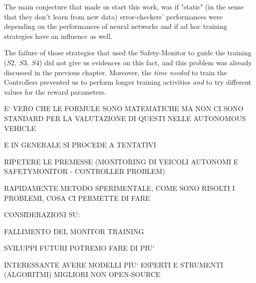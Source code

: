 The main conjecture that made us start this work, was if "static" (in the sense that they don't learn from new data) error-checkers' performances were depending on the performances of neural networks and if ad hoc training strategies have an influence as well.

The failure of those strategies that used the Safety-Monitor to guide the training ($S2,\: S3,\: S4$) did not give us evidences on this fact, and this problem was already discussed in the previous chapter. Moreover, the \textsl{time needed} to train the Controllers prevented us to perform longer training activities \textsl{and} to try different values for the reward parameters.

E` VERO CHE LE FORMULE SONO MATEMATICHE MA NON CI SONO STANDARD PER LA VALUTAZIONE DI QUESTI NELLE AUTONOMOUS VEHICLE

E IN GENERALE SI PROCEDE A TENTATIVI

RIPETERE LE PREMESSE (MONITORING DI VEICOLI AUTONOMI E SAFETYMONITOR - CONTROLLER PROBLEM)

RAPIDAMENTE METODO SPERIMENTALE, COME SONO RISOLTI I PROBLEMI, COSA CI PERMETTE DI FARE

CONSIDERAZIONI SU:

FALLIMENTO DEL MONITOR TRAINING

SVILUPPI FUTURI POTREMO FARE DI PIU`

INTERESSANTE AVERE MODELLI PIU` ESPERTI E STRUMENTI (ALGORITMI) MIGLIORI NON OPEN-SOURCE